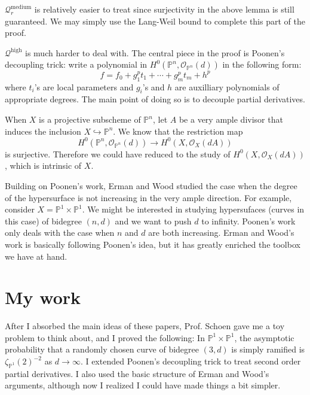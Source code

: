 \documentclass[12pt]{article}
\theoremstyle{plain}
\theoremstyle{definition}
\newcommand{\IP}{\mathbb{P}}
\newcommand{\sO}{\mathcal{O}}
\newcommand{\<}{\langle}
\renewcommand{\>}{\rangle}
\newcommand{\into}{\hookrightarrow}
\newcommand{\Qmed}{\mathcal{Q}_r^\mathrm{medium}}
\newcommand{\Qhigh}{\mathcal{Q}^\mathrm{high}}
\begin{document}
$\Qmed$ is relatively easier to treat since surjectivity in the above lemma is still guaranteed. We may simply use the Lang-Weil bound to complete this part of the proof. 

$\Qhigh$ is much harder to deal with. The central piece in the proof is Poonen's decoupling trick: write a polynomial in $H^0(\IP^n, \sO_{\IP^n}(d))$ in the following form:
$$ f = f_0 + g_1^p t_1 + \cdots + g_m^p t_m + h^p $$ 
where $t_i$'s are local parameters and $g_i$'s and $h$ are auxilliary polynomials of appropriate degrees. The main point of doing so is to decouple partial derivatives. 

When $X$ is a projective subscheme of $\IP^n$, let $A$ be a very ample divisor that induces the inclusion $X \into \IP^n$. We know that the restriction map 
$$ H^0(\IP^n, \sO_{\IP^n}(d)) \to H^0(X, \sO_X(d A)) $$ 
is surjective. Therefore we could have reduced to the study of $H^0(X, \sO_X(d A))$, which is intrinsic of $X$. 

Building on Poonen's work, Erman and Wood studied the case when the degree of the hypersurface is not increasing in the very ample direction. For example, consider $X = \IP^1 \times \IP^1$. We might be interested in studying hypersufaces (curves in this case) of bidegree $(n, d)$ and we want to push $d$ to infinity. Poonen's work only deals with the case when $n$ and $d$ are both increasing. Erman and Wood's work is basically following Poonen's idea, but it has greatly enriched the toolbox we have at hand. 

\section{My work}

After I absorbed the main ideas of these papers, Prof. Schoen gave me a toy problem to think about, and I proved the following: In $\IP^1 \times \IP^1$, the asymptotic probability that a randomly chosen curve of bidegree $(3, d)$ is simply ramified is $\zeta_{\IP^1}(2)^{-2}$ as $d \to \infty$. I extended Poonen's decoupling trick to treat second order partial derivatives. I also used the basic structure of Erman and Wood's arguments, although now I realized I could have made things a bit simpler. 
\end{document}
